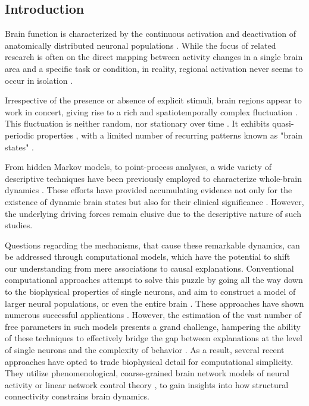 \documentclass{article}
\begin{document}
\subsection{Introduction}\label{Introduction}

Brain function is characterized by the continuous activation and deactivation of anatomically distributed neuronal
populations \citep{buzsaki2006rhythms}.
While the focus of related research is often on the direct mapping between activity changes in a single brain
area and a specific task or condition, in reality, regional activation never seems to occur in isolation
\citep{bassett2017network}.

Irrespective of the presence or absence of explicit stimuli, brain regions appear to work in concert, giving rise to a
rich and spatiotemporally complex fluctuation \citep{gutierrez2019infraslow}.
This fluctuation is neither random, nor stationary over time \citep{liu2013time, zalesky2014time}.
It exhibits quasi-periodic properties \citep{thompson2014quasi}, with a limited number of
recurring patterns known as "brain states" \citep{greene2023everyone, vidaurre2017brain, liu2013time, richiardi2011decoding}.

From hidden Markov models, to point-process analyses, a wide variety of descriptive techniques have been previously
employed to characterize whole-brain dynamics \citep{smith2012temporally, vidaurre2017brain, liu2013time, chen2018human}.
These efforts have provided accumulating evidence not only for the existence of dynamic brain states but also for their clinical
significance \citep{hutchison2013dynamic, barttfeld2015signature, meer2020movie}.
However, the underlying driving forces remain elusive due to the descriptive nature of such studies.

Questions regarding the mechanisms, that cause these remarkable dynamics, can be addressed through computational models, which have the potential to shift our understanding from mere associations to causal explanations.
Conventional computational approaches attempt to solve this puzzle by going all the way down to the biophysical properties of single neurons, and aim to construct a model of larger neural populations, or even the entire brain
\citep{breakspear2017dynamic}.
These approaches have shown numerous successful applications \citep{murray2018biophysical, kriegeskorte2018cognitive, heinz2019towards}.
However, the estimation of the vast number of free parameters in such models presents a grand challenge, hampering the ability of these techniques to effectively bridge the gap between explanations at the level of single neurons and the complexity of behavior \citep{breakspear2017dynamic}. As a result, several recent approaches have opted to trade biophysical detail for computational simplicity. They utilize phenomenological, coarse-grained brain network models \citep{schirner2022dynamic, schiff1994controlling, papadopoulos2017development} of neural activity or linear network control theory  \citep{luppi2023transitions, chiem2021structure, gu2017optimal, scheid2021time, gu2015controllability}, to gain insights into how structural connectivity constrains brain dynamics.
\end{document}
